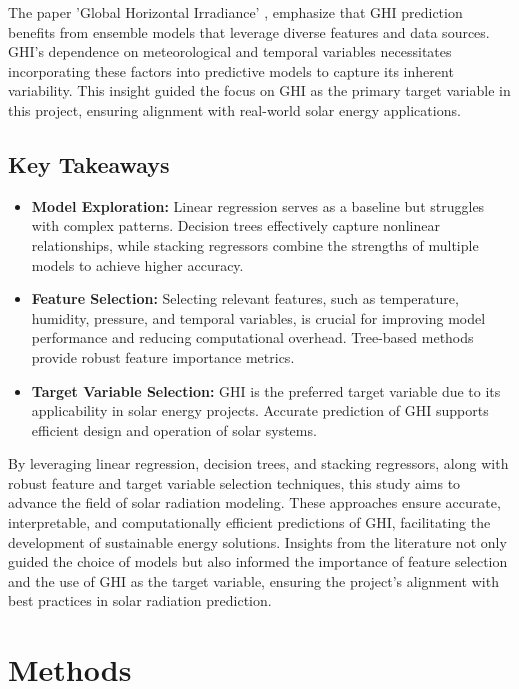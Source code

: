 \documentclass[10pt,twocolumn]{article}
\begin{document}
\begin{itemize}
The paper 'Global Horizontal Irradiance' \cite{8}, emphasize that GHI prediction benefits from ensemble models that leverage diverse features and data sources. GHI's dependence on meteorological and temporal variables necessitates incorporating these factors into predictive models to capture its inherent variability. This insight guided the focus on GHI as the primary target variable in this project, ensuring alignment with real-world solar energy applications.

\subsection{Key Takeaways}
\begin{itemize}
    \item \textbf{Model Exploration:} Linear regression serves as a baseline but struggles with complex patterns. Decision trees effectively capture nonlinear relationships, while stacking regressors combine the strengths of multiple models to achieve higher accuracy.
    \item \textbf{Feature Selection:} Selecting relevant features, such as temperature, humidity, pressure, and temporal variables, is crucial for improving model performance and reducing computational overhead. Tree-based methods provide robust feature importance metrics.
    \item \textbf{Target Variable Selection:} GHI is the preferred target variable due to its applicability in solar energy projects. Accurate prediction of GHI supports efficient design and operation of solar systems.
\end{itemize}

By leveraging linear regression, decision trees, and stacking regressors, along with robust feature and target variable selection techniques, this study aims to advance the field of solar radiation modeling. These approaches ensure accurate, interpretable, and computationally efficient predictions of GHI, facilitating the development of sustainable energy solutions. Insights from the literature not only guided the choice of models but also informed the importance of feature selection and the use of GHI as the target variable, ensuring the project's alignment with best practices in solar radiation prediction.






\section{Methods}


\end{itemize}
\end{document}
